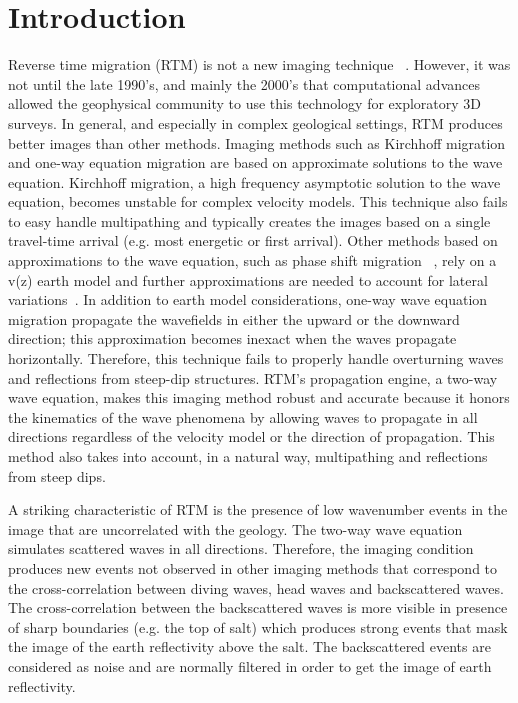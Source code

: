 \section{Introduction}

Reverse time migration (RTM) is not a new imaging technique ~\citep{baysal:1514, whitmore:382, GPR:GPR413}.
However, it was not until the late 1990’s, and mainly the 2000’s that computational
 advances allowed the geophysical community to use this technology for exploratory
3D surveys. In general, and especially in complex geological settings, RTM produces better 
images than other methods. Imaging methods such as Kirchhoff migration and one-way equation
 migration are based on approximate solutions to the wave equation. Kirchhoff migration,
 a high frequency asymptotic solution to the wave equation, becomes unstable for complex velocity models.
 This technique also fails to easy handle multipathing and typically creates the images based on a 
single travel-time arrival (e.g. most energetic or first arrival). Other methods based on approximations to the wave
 equation, such as phase shift migration ~\citep{gazdag:1342}, rely on a v(z) earth model and further
 approximations are needed to account for lateral variations~\citep{gazdag:124}.
 In addition to earth model considerations, one-way wave equation migration propagate the wavefields in 
either the upward or the downward direction; this approximation becomes inexact when the waves 
propagate horizontally. Therefore, this technique fails to properly handle overturning
waves and reflections from steep-dip structures. RTM's propagation engine, a two-way wave equation, 
makes this imaging method robust and accurate because it honors the kinematics of 
the wave phenomena by allowing waves to propagate in all directions regardless of
 the velocity model or the direction of propagation. This method also takes into account,
 in a natural way, multipathing and  reflections from steep dips.

A striking characteristic of RTM is the presence of low wavenumber events in the image that
 are uncorrelated with the geology. The two-way wave equation simulates scattered waves in all 
directions. Therefore, the imaging condition produces new events not observed in 
other imaging methods that correspond to the cross-correlation between diving waves, head waves 
and backscattered waves. The cross-correlation between the backscattered waves is more visible in
presence of sharp boundaries (e.g. the top of salt) which produces strong events that mask the image of the 
earth reflectivity above the salt. The backscattered events are considered as noise and are normally filtered in order
to get the image of earth reflectivity.

